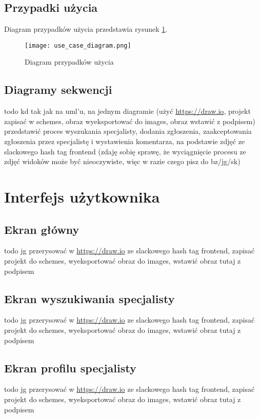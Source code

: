 \documentclass[10pt, titlepage, oneside, a4paper]{article}
\begin{document}
  \subsection{Przypadki użycia}
  Diagram przypadków użycia przedstawia rysunek \ref{fig:ucDiagram}.

  \begin{figure}[h]
	  \centering
	  \texttt{[image: use\_case\_diagram.png]}
	  \caption{Diagram przypadków użycia}
	  \label{fig:ucDiagram}
  \end{figure}
  
  \subsection{Diagramy sekwencji}
	todo kd tak jak na uml'u, na jednym diagramie (użyć \url{https://draw.io}, projekt zapisać w schemes, obraz wyeksportować do images, obraz wstawić z podpisem) przedstawić proces wyszukania specjalisty, dodania zgłoszenia, zaakceptowania zgłoszenia przez specjalistę i wystawienia komentarza, na podstawie zdjęć ze slackowego hash tag frontend (zdaję sobię sprawę, że wyciągnięcie procesu ze zdjęć widoków może być nieoczywiste, więc w razie czego pisz do bz/jg/sk)
  
	\section{Interfejs użytkownika}
  
	\subsection{Ekran główny}
	todo jg przerysować w \url{https://draw.io} ze slackowego hash tag frontend, zapisać projekt do schemes, wyeksportować obraz do images, wstawić obraz tutaj z podpisem
	
	\subsection{Ekran wyszukiwania specjalisty}
	todo jg przerysować w \url{https://draw.io} ze slackowego hash tag frontend, zapisać projekt do schemes, wyeksportować obraz do images, wstawić obraz tutaj z podpisem
	
	\subsection{Ekran profilu specjalisty}	
	todo jg przerysować w \url{https://draw.io} ze slackowego hash tag frontend, zapisać projekt do schemes, wyeksportować obraz do images, wstawić obraz tutaj z podpisem	
	
\end{document}
